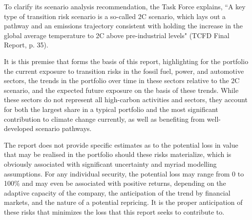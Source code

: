 \documentclass[10pt,table]{article}\usepackage[]{graphicx}\usepackage[]{color}
\begin{document}
\begin{multicols}{2}
		To clarify its scenario analysis recommendation, the Task Force explains, ``A key type of transition risk scenario is a so-called 2\degree C scenario, which lays out a pathway and an emissions trajectory consistent with holding the increase in the global average temperature to 2\degree C above pre-industrial levels" (TCFD Final Report, p. 35).

		It is this premise that forms the basis of this report, highlighting for the portfolio the current exposure to transition risks in the fossil fuel, power, and automotive sectors, the trends in the portfolio over time in these sectors relative to the 2\degree C scenario, and the expected future exposure on the basis of these trends. While these sectors do not represent all high-carbon activities and sectors, they account for both the largest share in a typical portfolio and the most significant contribution to climate change currently, as well as benefiting from well-developed scenario pathways.

		The report does not provide specific estimates as to the potential loss in value that may be realised in the portfolio should these risks materialize, which is obviously associated with significant uncertainty and myriad modelling assumptions. For any individual security, the potential loss may range from 0 to 100\% and may even be associated with positive returns, depending on the adaptive capacity of the company, the anticipation of the trend by financial markets, and the nature of a potential repricing. It is the proper anticipation of these risks that minimizes the loss that this report seeks to contribute to. 



	\end{multicols}
\end{document}
